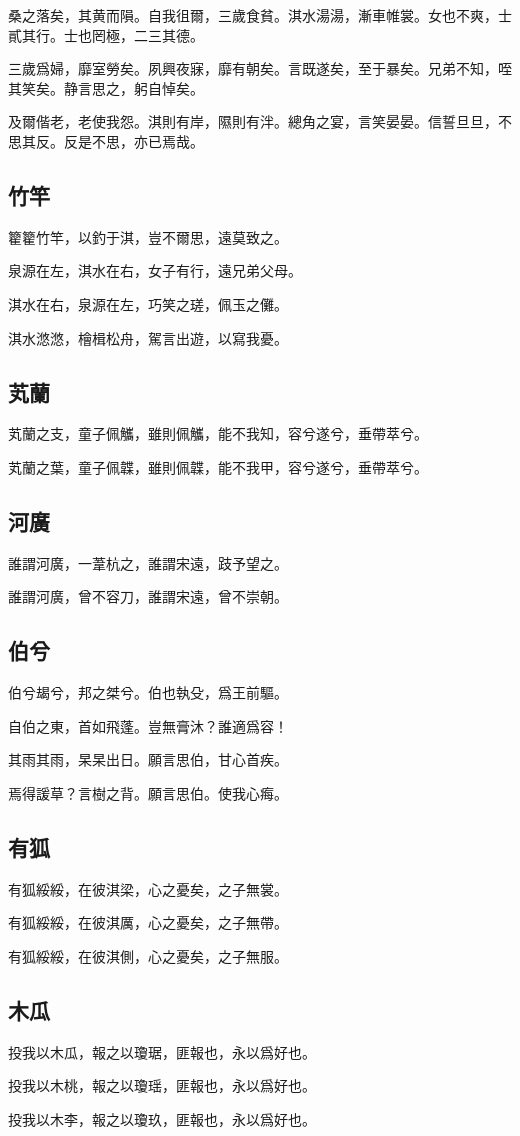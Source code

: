 桑之落矣，其黄而隕。自我徂爾，三歲食貧。淇水湯湯，漸車帷裳。女也不爽，士貳其行。士也罔極，二三其德。

三歲爲婦，靡室勞矣。夙興夜寐，靡有朝矣。言既遂矣，至于暴矣。兄弟不知，咥其笑矣。静言思之，躬自悼矣。

及爾偕老，老使我怨。淇則有岸，隰則有泮。總角之宴，言笑晏晏。信誓旦旦，不思其反。反是不思，亦已焉哉。

\subsection[竹竿]{竹竿}

籊籊竹竿，以釣于淇，豈不爾思，遠莫致之。

泉源在左，淇水在右，女子有行，遠兄弟父母。

淇水在右，泉源在左，巧笑之瑳，佩玉之儺。

淇水滺滺，檜楫松舟，駕言出遊，以寫我憂。

\subsection[芄蘭]{芄蘭}

芄蘭之支，童子佩觿，雖則佩觿，能不我知，容兮遂兮，垂帶萃兮。

芄蘭之葉，童子佩韘，雖則佩韘，能不我甲，容兮遂兮，垂帶萃兮。

\subsection[河廣]{河廣}

誰謂河廣，一葦杭之，誰謂宋遠，跂予望之。

誰謂河廣，曾不容刀，誰謂宋遠，曾不崇朝。

\subsection[伯兮]{伯兮}

伯兮朅兮，邦之桀兮。伯也執殳，爲王前驅。

自伯之東，首如飛蓬。豈無膏沐？誰適爲容！

其雨其雨，杲杲出日。願言思伯，甘心首疾。

焉得諼草？言樹之背。願言思伯。使我心痗。

\subsection[有狐]{有狐}

有狐綏綏，在彼淇梁，心之憂矣，之子無裳。

有狐綏綏，在彼淇厲，心之憂矣，之子無帶。

有狐綏綏，在彼淇側，心之憂矣，之子無服。

\subsection[木瓜]{木瓜}

投我以木瓜，報之以瓊琚，匪報也，永以爲好也。

投我以木桃，報之以瓊瑶，匪報也，永以爲好也。

投我以木李，報之以瓊玖，匪報也，永以爲好也。
